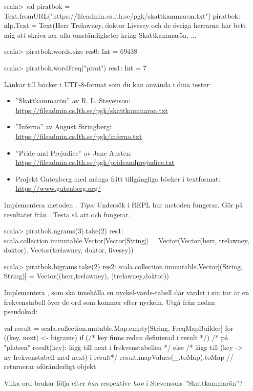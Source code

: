\begin{REPL}[basicstyle=\color{white}\ttfamily\fontsize{9}{11}\selectfont]
scala> val piratbok = Text.fromURL("https://fileadmin.cs.lth.se/pgk/skattkammaron.txt")
piratbok: nlp.Text = Text(Herr Trelawney, doktor Livesey och de övriga herrarna har bett mig att skriva ner alla omständigheter kring Skattkammarön, ...

scala> piratbok.words.size
res0: Int = 69438

scala> piratbok.wordFreq("pirat")
res1: Int = 7
\end{REPL}
Länkar till böcker i UTF-8-format som du kan använda i dina tester:
\begin{itemize}%
\item ''Skattkammarön'' av R. L. Stevenson: \\\url{https://fileadmin.cs.lth.se/pgk/skattkammaron.txt}
\item ''Inferno'' av August Stringberg: \\\url{https://fileadmin.cs.lth.se/pgk/inferno.txt}
\item ''Pride and Prejudice'' av Jane Austen: \\\url{https://fileadmin.cs.lth.se/pgk/prideandprejudice.txt}
\item Projekt Gutenberg med många fritt tillgängliga böcker i textformat: \\\url{https://www.gutenberg.org/}
\end{itemize}






\Task Implementera metoden . \emph{Tips:} Undersök i REPL hur metoden  fungerar. Gör  på resultatet från . Testa så att  och  fungerar.
\begin{REPL}
scala> piratbok.ngrams(3).take(2)
res1: scala.collection.immutable.Vector[Vector[String]] =
Vector(Vector(herr, trelawney, doktor), Vector(trelawney, doktor, livesey))

scala> piratbok.bigrams.take(2)
res2: scala.collection.immutable.Vector[(String, String)] =
Vector((herr,trelawney), (trelawney,doktor))
\end{REPL}

\Task Implementera , som ska innehålla en nyckel-värde-tabell där värdet i sin tur är en frekvenstabell över de ord som kommer efter nyckeln. Utgå från nedan pseudokod:
\begin{Code}
val result = scala.collection.mutable.Map.empty[String, FreqMapBuilder]
for ((key, next) <- bigrams) {
  if (/* key finns redan definierad i result */)
    /* på "platsen" result(key): lägg till next i frekvenstabellen */
  else
    /* lägg till (key -> ny frekvenstabell med next) i result*/
}
result.mapValues(_.toMap).toMap // returnerar oföränderligt objekt
\end{Code}
\Subtask Vilka ord brukar följa efter \emph{han} respektive \emph{hon} i Stevensons ''Skattkammarön''?

